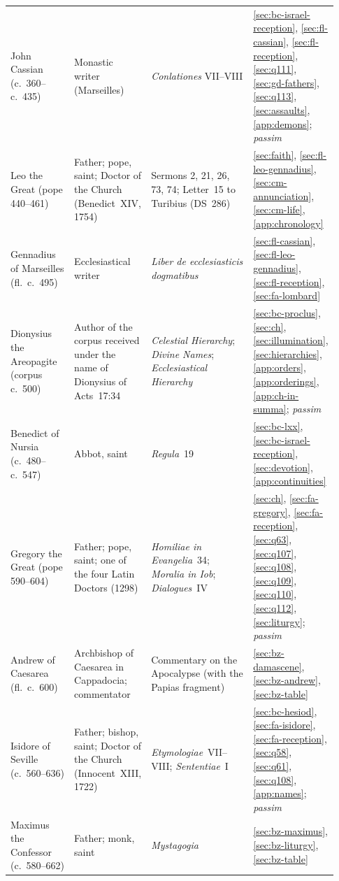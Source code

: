 \begin{longtable}{@{}>{\raggedright\arraybackslash}p{0.21\linewidth}>{\raggedright\arraybackslash}p{0.20\linewidth}>{\raggedright\arraybackslash}p{0.35\linewidth}>{\raggedright\arraybackslash}p{0.17\linewidth}@{}}
John Cassian (c.~360--c.~435) & Monastic writer (Marseilles) & \emph{Conlationes} VII--VIII & \ref{sec:bc-israel-reception}, \ref{sec:fl-cassian}, \ref{sec:fl-reception}, \ref{sec:q111}, \ref{sec:gd-fathers}, \ref{sec:q113}, \ref{sec:assaults}, \ref{app:demons}; \emph{passim}\\
Leo the Great (pope 440--461) & Father; pope, saint; Doctor of the Church (Benedict~XIV, 1754) & Sermons 2, 21, 26, 73, 74; Letter~15 to Turibius (DS~286) & \ref{sec:faith}, \ref{sec:fl-leo-gennadius}, \ref{sec:cm-annunciation}, \ref{sec:cm-life}, \ref{app:chronology}\\
Gennadius of Marseilles (fl.~c.~495) & Ecclesiastical writer & \emph{Liber de ecclesiasticis dogmatibus} & \ref{sec:fl-cassian}, \ref{sec:fl-leo-gennadius}, \ref{sec:fl-reception}, \ref{sec:fa-lombard}\\
Dionysius the Areopagite (corpus c.~500) & Author of the corpus received under the name of Dionysius of Acts~17:34 & \emph{Celestial Hierarchy}; \emph{Divine Names}; \emph{Ecclesiastical Hierarchy} & \ref{sec:bc-proclus}, \ref{sec:ch}, \ref{sec:illumination}, \ref{sec:hierarchies}, \ref{app:orders}, \ref{app:orderings}, \ref{app:ch-in-summa}; \emph{passim}\\
Benedict of Nursia (c.~480--c.~547) & Abbot, saint & \emph{Regula}~19 & \ref{sec:bc-lxx}, \ref{sec:bc-israel-reception}, \ref{sec:devotion}, \ref{app:continuities}\\
Gregory the Great (pope 590--604) & Father; pope, saint; one of the four Latin Doctors (1298) & \emph{Homiliae in Evangelia}~34; \emph{Moralia in Iob}; \emph{Dialogues}~IV & \ref{sec:ch}, \ref{sec:fa-gregory}, \ref{sec:fa-reception}, \ref{sec:q63}, \ref{sec:q107}, \ref{sec:q108}, \ref{sec:q109}, \ref{sec:q110}, \ref{sec:q112}, \ref{sec:liturgy}; \emph{passim}\\
Andrew of Caesarea (fl.~c.~600) & Archbishop of Caesarea in Cappadocia; commentator & Commentary on the Apocalypse (with the Papias fragment) & \ref{sec:bz-damascene}, \ref{sec:bz-andrew}, \ref{sec:bz-table}\\
Isidore of Seville (c.~560--636) & Father; bishop, saint; Doctor of the Church (Innocent~XIII, 1722) & \emph{Etymologiae}~VII--VIII; \emph{Sententiae}~I & \ref{sec:bc-hesiod}, \ref{sec:fa-isidore}, \ref{sec:fa-reception}, \ref{sec:q58}, \ref{sec:q61}, \ref{sec:q108}, \ref{app:names}; \emph{passim}\\
Maximus the Confessor (c.~580--662) & Father; monk, saint & \emph{Mystagogia} & \ref{sec:bz-maximus}, \ref{sec:bz-liturgy}, \ref{sec:bz-table}\\

\end{longtable}

